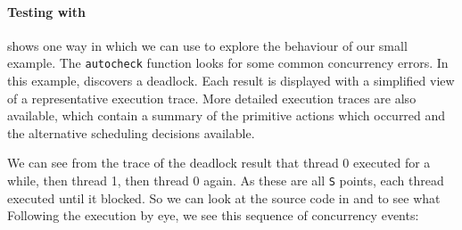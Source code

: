 \paragraph{Testing with \dejafu{}}
 shows one way in which we can use
\dejafu{} to explore the behaviour of our small example.  The
\verb|autocheck| function looks for some common concurrency errors.
In this example, \dejafu{} discovers a deadlock.  Each result is
displayed with a simplified view of a representative execution trace.
More detailed execution traces are also available, which contain a
summary of the primitive actions which occurred and the alternative
scheduling decisions available.

We can see from the trace of the deadlock result that thread 0
executed for a while, then thread 1, then thread 0 again.  As these
are all \verb|S| points, each thread executed until it blocked.  So we
can look at the source code in  and
 to see what Following the execution by eye, we
see this sequence of concurrency events:

